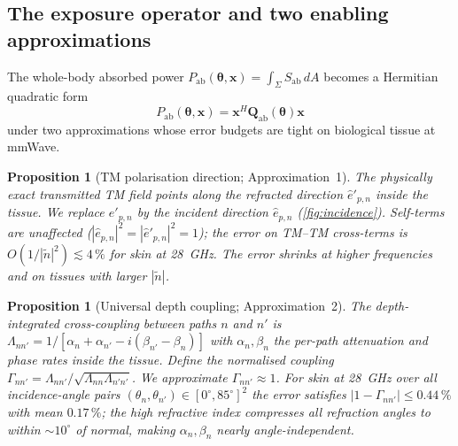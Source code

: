 \documentclass[journal,twocolumn,10pt]{IEEEtran}
\theoremstyle{plain}
\newtheorem{proposition}[theorem]{Proposition}
\theoremstyle{definition}
\theoremstyle{remark}
\newcommand{\xx}{\mathbf{x}}
\newcommand{\Sab}{S_{\mathrm{ab}}}
\newcommand{\Pabs}{P_{\mathrm{ab}}}
\newcommand{\Qabs}{\mathbf{Q}_{\mathrm{ab}}}
\newcommand{\thetab}{\bm{\theta}}
\newcommand{\ntilde}{\tilde{n}}
\begin{document}
\subsection{The exposure operator and two enabling approximations}

The whole-body absorbed power $\Pabs(\thetab,\xx) = \int_{\Sigma}
\Sab\,dA$ becomes a Hermitian quadratic form
\begin{equation}\label{eq:Qabs}
\Pabs(\thetab,\xx) = \xx^{H} \Qabs(\thetab) \xx
\end{equation}
under two approximations whose error budgets are tight on biological
tissue at mmWave.

\begin{proposition}[TM polarisation direction; Approximation~1]\label{prop:approx1}
The physically exact transmitted TM field points along the refracted
direction $\hat{e}'_{p,n}$ inside the tissue. We replace
$\hat{e}'_{p,n}$ by the incident direction $\hat{e}_{p,n}$
(\cref{fig:incidence}). Self-terms are unaffected ($|\hat{e}_{p,n}|^2 =
|\hat{e}'_{p,n}|^2 = 1$); the error on TM--TM cross-terms is
$O(1/|\ntilde|^2) \lesssim 4\,\%$ for skin at 28~GHz. The error
shrinks at higher frequencies and on tissues with larger $|\ntilde|$.
\end{proposition}

\begin{proposition}[Universal depth coupling; Approximation~2]\label{prop:approx2}
The depth-integrated cross-coupling between paths $n$ and $n'$ is
$\Lambda_{nn'} = 1 / [\alpha_n + \alpha_{n'} - i(\beta_{n'} - \beta_n)]$
with $\alpha_n, \beta_n$ the per-path attenuation and phase rates
inside the tissue. Define the normalised coupling $\Gamma_{nn'} =
\Lambda_{nn'} / \sqrt{\Lambda_{nn}\Lambda_{n'n'}}$. We approximate
$\Gamma_{nn'} \approx 1$. For skin at 28~GHz over all incidence-angle
pairs $(\theta_n,\theta_{n'}) \in [0^{\circ},85^{\circ}]^2$ the error
satisfies $|1 - \Gamma_{nn'}| \leq 0.44\,\%$ with mean $0.17\,\%$;
the high refractive index compresses all refraction angles to within
$\sim\!10^{\circ}$ of normal, making $\alpha_n,\beta_n$ nearly
angle-independent.
\end{proposition}
\end{document}
